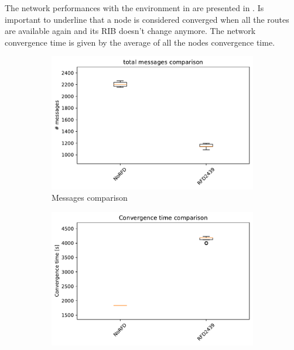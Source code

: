The network performances with the environment in  are
presented in .
Is important to underline that a node is considered converged when all the routes
are available again and its \ac{RIB} doesn't change anymore.
The network convergence time is given by the average of all the nodes convergence
time.
\begin{figure}[h]
     \centering
     \begin{subfigure}[b]{0.49\textwidth}
         \centering
         \includegraphics[width=\textwidth]{images/RFD/clique/clique_rfd_comparison_2439_messages_boxplot.pdf}
         \caption{Messages comparison}
         \label{fig:RFD_2439_clique_MRAI30_messages}
     \end{subfigure}
     \hfill
     \begin{subfigure}[b]{0.49\textwidth}
         \centering
         \includegraphics[width=\textwidth]{images/RFD/clique/clique_rfd_comparison_2439_time_boxplot.pdf}

\end{subfigure}
\end{figure}
